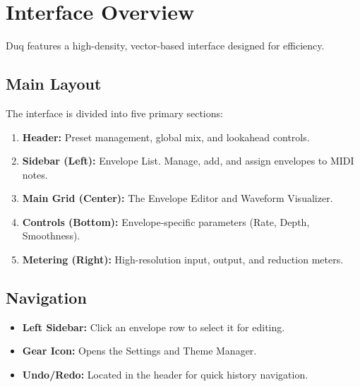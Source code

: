 \chapter{Interface Overview}
\label{ch:interface_overview}

Duq features a high-density, vector-based interface designed for efficiency.

\section{Main Layout}
The interface is divided into five primary sections:

\begin{enumerate}
    \item \textbf{Header:} Preset management, global mix, and lookahead controls.
    \item \textbf{Sidebar (Left):} Envelope List. Manage, add, and assign envelopes to MIDI notes.
    \item \textbf{Main Grid (Center):} The Envelope Editor and Waveform Visualizer.
    \item \textbf{Controls (Bottom):} Envelope-specific parameters (Rate, Depth, Smoothness).
    \item \textbf{Metering (Right):} High-resolution input, output, and reduction meters.
\end{enumerate}

\section{Navigation}
\begin{itemize}
    \item \textbf{Left Sidebar:} Click an envelope row to select it for editing.
    \item \textbf{Gear Icon:} Opens the Settings and Theme Manager.
    \item \textbf{Undo/Redo:} Located in the header for quick history navigation.
\end{itemize}

